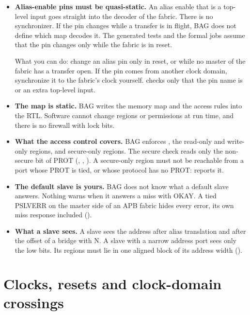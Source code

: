 \begin{itemize}
\item \textbf{Alias-enable pins must be quasi-static.} An alias enable that is a
  top-level input goes straight into the decoder of the fabric. There is no synchronizer.
  If the pin changes while a transfer is in flight, BAG does not define which map
  decodes it. The generated tests and the formal jobs assume that the pin changes only
  while the fabric is in reset.

  What you can do: change an alias pin only in reset, or while no master of the fabric
  has a transfer open. If the pin comes from another clock domain, synchronize it to the
  fabric's clock yourself.  checks only that the pin name is
   or an extra top-level input.
\item \textbf{The map is static.} BAG writes the memory map and the access rules into the
  RTL. Software cannot change regions or permissions at run time, and there is no
  firewall with lock bits.
\item \textbf{What the access control covers.} BAG enforces , the
  read-only and write-only regions, and secure-only regions. The secure check reads only
  the non-secure bit of PROT (, , ). A
  secure-only region must not be reachable from a port whose PROT is tied, or whose
  protocol has no PROT:  reports it.
\item \textbf{The default slave is yours.} BAG does not know what a default slave
  answers. Nothing warns when it answers a miss with OKAY. A tied PSLVERR on the master
  side of an APB fabric hides every error, its own miss response included
  ().
\item \textbf{What a slave sees.} A slave sees the address after alias translation and
  after the offset of a bridge with  N. A slave with a narrow
  address port sees only the low bits. Its regions must lie in one aligned block of its
  address width ().
\end{itemize}

\section{Clocks, resets and clock-domain crossings}

